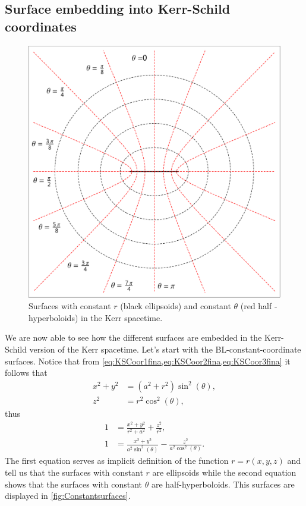 \subsection{Surface embedding into Kerr-Schild coordinates}
  \begin{figure}   
\begin{center}
 \centerline{\includegraphics[width=.7\textwidth]{img/Chapter1/Surfaces.pdf}}
 \end{center}
 \caption{Surfaces with constant $r$ (black ellipsoids) and constant $\theta$ (red half\- -hyperboloids) in the Kerr spacetime.}
 \label{fig:Constantsurfaces}
\end{figure} 
We are now able to see how the different surfaces are embedded in the Kerr-Schild version of the Kerr spacetime. Let's start with the \gls{BL}-constant-coordinate surfaces. Notice that from \cref{eq:KSCoor1fina,eq:KSCoor2fina,eq:KSCoor3fina} it follows that
\begin{align}
 x^2+y^2&=(a^2+r^2) \sin^2{(\theta)},\\
 z^2&=r^2 \cos^2(\theta),
\end{align}
thus
\begin{align}
 1&=\frac{x^2+y^2}{r^2+a^2}+\frac{z^2}{r^2} \label{eq:rdefinition},\\
 1&=\frac{x^2+y^2}{a^2 \sin^2(\theta)}-\frac{z^2}{a^2 \cos^2(\theta)}.
\end{align}
The first equation serves as implicit definition of the function $r=r(x,y,z)$ and tell us that the surfaces with constant $r$ are ellipsoids while the second equation shows that the surfaces with constant $\theta$ are half-hyperboloids. This surfaces are displayed in \vref{fig:Constantsurfaces}.
